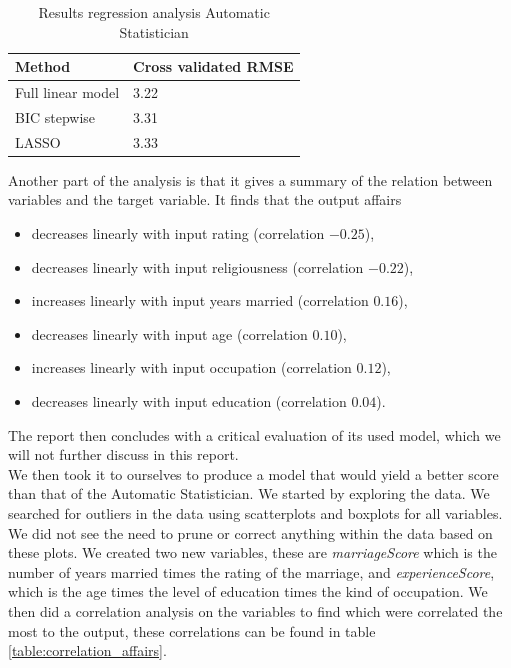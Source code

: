 \documentclass[a4paper, 10pt, conference]{ieeeconf}
\begin{document}
\begin{table}[!ht]
\centering
\begin{tabular}{| l | l |}
  \hline
  Method & Cross validated RMSE \\
  \hline
  Full linear model & 3.22 \\
  BIC stepwise & 3.31 \\
  LASSO & 3.33 \\
  \hline
\end{tabular}
\caption{Results regression analysis Automatic Statistician}
\label{table:as_affairs}
\end{table}

Another part of the analysis is that it gives a summary of the relation between variables and the target variable. It finds that the output affairs

\begin{itemize}
    \item decreases linearly with input rating (correlation $-0.25$),
    \item decreases linearly with input religiousness (correlation $-0.22$),
    \item increases linearly with input years married (correlation $0.16$),
    \item decreases linearly with input age (correlation $0.10$),
    \item increases linearly with input occupation (correlation $0.12$),
    \item decreases linearly with input education (correlation $0.04$).
\end{itemize}

The report then concludes with a critical evaluation of its used model, which we will not further discuss in this report.\\

We then took it to ourselves to produce a model that would yield a better score than that of the Automatic Statistician. We started by exploring the data. We searched for outliers in the data using scatterplots and boxplots for all variables. We did not see the need to prune or correct anything within the data based on these plots. We created two new variables, these are \textit{marriageScore} which is the number of years married times the rating of the marriage, and \textit{experienceScore}, which is the age times the level of education times the kind of occupation. We then did a correlation analysis on the variables to find which were correlated the most to the output, these correlations can be found in table \ref{table:correlation_affairs}.
\end{document}
